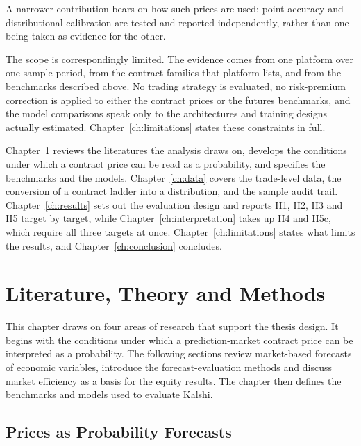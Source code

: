 \documentclass[12pt,a4paper]{report}
\begin{document}
A narrower contribution bears on how such prices are used: point accuracy and
distributional calibration are tested and reported independently, rather than
one being taken as evidence for the other.

The scope is correspondingly limited. The evidence comes from one platform
over one sample period, from the contract families that platform lists, and
from the benchmarks described above. No trading strategy is evaluated, no
risk-premium correction is applied to either the contract prices or the
futures benchmarks, and the model comparisons speak only to the architectures
and training designs actually estimated. Chapter~\ref{ch:limitations} states
these constraints in full.

Chapter~\ref{ch:theory} reviews the literatures the analysis draws on,
develops the conditions under which a contract price can be read as a
probability, and specifies the benchmarks and the models.
Chapter~\ref{ch:data} covers the trade-level data, the conversion of a
contract ladder into a distribution, and the sample audit trail.
Chapter~\ref{ch:results} sets out the evaluation design and reports H1, H2, H3
and H5 target by target, while Chapter~\ref{ch:interpretation} takes up H4 and
H5c, which require all three targets at once. Chapter~\ref{ch:limitations}
states what limits the results, and Chapter~\ref{ch:conclusion} concludes.

\chapter{Literature, Theory and Methods}
\label{ch:theory}

This chapter draws on four areas of research that support the thesis design. It
begins with the conditions under which a prediction-market contract price can
be interpreted as a probability. The following sections review market-based
forecasts of economic variables, introduce the forecast-evaluation methods and
discuss market efficiency as a basis for the equity results. The chapter then
defines the benchmarks and models used to evaluate Kalshi.

\section{Prices as Probability Forecasts}
\label{sec:literature}
\end{document}
